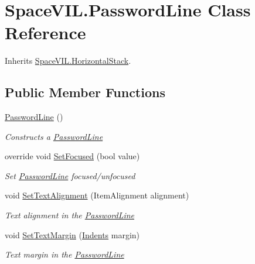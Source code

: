 \hypertarget{class_space_v_i_l_1_1_password_line}{}\section{Space\+V\+I\+L.\+Password\+Line Class Reference}
\label{class_space_v_i_l_1_1_password_line}


Inherits \mbox{\hyperlink{class_space_v_i_l_1_1_horizontal_stack}{Space\+V\+I\+L.\+Horizontal\+Stack}}.

\subsection*{Public Member Functions}
\begin{DoxyCompactItemize}
\item 
\mbox{\hyperlink{class_space_v_i_l_1_1_password_line_a3630df351295bbb158675c718a4071be}{Password\+Line}} ()
\begin{DoxyCompactList}\small\item\em Constructs a \mbox{\hyperlink{class_space_v_i_l_1_1_password_line}{Password\+Line}} \end{DoxyCompactList}\item 
override void \mbox{\hyperlink{class_space_v_i_l_1_1_password_line_ac82ce0352c02dab703ac18e6d81798a5}{Set\+Focused}} (bool value)
\begin{DoxyCompactList}\small\item\em Set \mbox{\hyperlink{class_space_v_i_l_1_1_password_line}{Password\+Line}} focused/unfocused \end{DoxyCompactList}\item 
void \mbox{\hyperlink{class_space_v_i_l_1_1_password_line_a578351e7e63ba70e457e2779fb692c6f}{Set\+Text\+Alignment}} (Item\+Alignment alignment)
\begin{DoxyCompactList}\small\item\em Text alignment in the \mbox{\hyperlink{class_space_v_i_l_1_1_password_line}{Password\+Line}} \end{DoxyCompactList}\item 
void \mbox{\hyperlink{class_space_v_i_l_1_1_password_line_affd2b37e2f8bc81d1633b629bae29dfd}{Set\+Text\+Margin}} (\mbox{\hyperlink{struct_space_v_i_l_1_1_decorations_1_1_indents}{Indents}} margin)
\begin{DoxyCompactList}\small\item\em Text margin in the \mbox{\hyperlink{class_space_v_i_l_1_1_password_line}{Password\+Line}} \end{DoxyCompactList}\item 

\end{DoxyCompactItemize}
